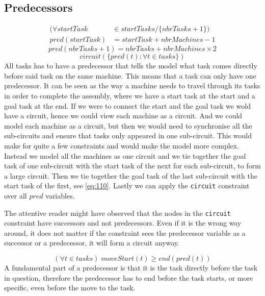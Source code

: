  \newpage
 \subsection{Predecessors}
 \begin{equation}\label{eq:109}
 \begin{aligned}
 (\forall startTask &\in startTasks / \{nbrTasks + 1\}) \\
 pred(startTask) &= startTask + nbrMachines - 1
 \end{aligned}
 \end{equation}
 \begin{equation}\label{eq:110}
 pred(nbrTasks + 1) = nbrTasks + nbrMachines \times 2
 \end{equation}
 \begin{equation}\label{eq:111}
 circuit(\{pred(t) : \forall t \in tasks\})
 \end{equation}
 All tasks has to have a predecessor that tells the model what task comes directly before said task on the same machine. This means that a task can only have one predecessor. It can be seen as the way a machine needs to travel through its tasks in order to complete the assembly, where we have a start task at the start and a goal task at the end. If we were to connect the start and the goal task we wold have a circuit, hence we could view each machine as a circuit. And we could model each machine as a circuit, but then we would need to synchronise all the sub-circuits and ensure that tasks only appeared in one sub-circuit. This would make for quite a few constraints and would make the model more complex. Instead we model all the machines as one circuit and we tie together the goal task of one sub-circuit with the start task of the next for each sub-circuit, to form a large circuit. Then we tie together the goal task of the last sub-circuit with the start task of the first, see \ref{eq:110}. Lastly we can apply the \texttt{circuit} constraint over all $pred$ variables.
 
The attentive reader might have observed that the nodes in the \texttt{circuit} constraint have successors and not predecessors. Even if it is the wrong way around, it does not matter if the constraint sees the predecessor variable as a successor or a predecessor, it will form a circuit anyway.
 
 \begin{equation}\label{eq:108}
 (\forall t \in tasks) \; moveStart(t) \geq end(pred(t))
 \end{equation}
A fundamental part of a predecessor is that it is the task directly before the task in question, therefore the predecessor has to end before the task starts, or more specific, even before the move to the task.
 
